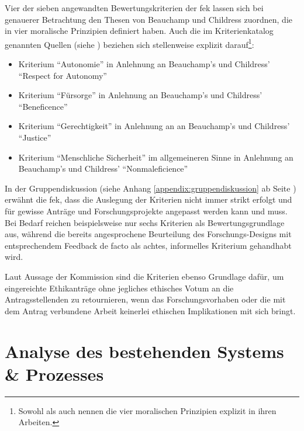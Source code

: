 \documentclass[a4paper,12pt,twoside]{scrreprt}
\begin{document}
\medskip

Vier der sieben angewandten Bewertungskriterien der \ac{fek} lassen sich bei genauerer Betrachtung den Thesen von Beauchamp und Childress zuordnen, die in \cite{beauchamp_principles_1994} vier moralische Prinzipien definiert haben. Auch die im Kriterienkatalog genannten Quellen (siehe \cite[2]{forschungsethik-kommission_der_fachhochschule_vorarlberg_kriterienkatalog_2021}) beziehen sich stellenweise explizit darauf\footnote{Sowohl \cite{marckmann_was_2000} als auch \cite{schuchter_care_2018} nennen die vier moralischen Prinzipien explizit in ihren Arbeiten.}:
\begin{itemize}
    \item Kriterium \enquote{Autonomie} in Anlehnung an Beauchamp's und Childress' \enquote{Respect for Autonomy} \cite[101-149]{beauchamp_principles_1994}
    \item Kriterium \enquote{Fürsorge} in Anlehnung an Beauchamp's und Childress' \enquote{Beneficence} \cite[202-248]{beauchamp_principles_1994}
    \item Kriterium \enquote{Gerechtigkeit} in Anlehnung an an Beauchamp's und Childress' \enquote{Justice} \cite[249-301]{beauchamp_principles_1994}
    \item Kriterium \enquote{Menschliche Sicherheit} im allgemeineren Sinne in Anlehnung an Beauchamp's und Childress' \enquote{Nonmaleficience} \cite[150-201]{beauchamp_principles_1994}
\end{itemize}

In der Gruppendiskussion (siehe Anhang \ref{appendix:gruppendiskussion} ab Seite \pageref{appendix:gruppendiskussion}) erwähnt die \acl{fek}, dass die Auslegung der Kriterien nicht immer strikt erfolgt und für gewisse Anträge und Forschungsprojekte angepasst werden kann und muss. Bei Bedarf reichen beispielsweise nur sechs Kriterien als Bewertungsgrundlage aus, während die bereits angesprochene Beurteilung des Forschungs-Designs mit entsprechendem Feedback de facto als achtes, informelles Kriterium gehandhabt wird.

Laut Aussage der Kommission sind die Kriterien ebenso Grundlage dafür, um eingereichte Ethikanträge ohne jegliches ethisches Votum an die Antragsstellenden zu retournieren, wenn das Forschungsvorhaben oder die mit dem Antrag verbundene Arbeit keinerlei ethischen Implikationen mit sich bringt.

\chapter{Analyse des bestehenden Systems \& Prozesses}
\label{chap:analyse-bestehendes-system-prozess}
\end{document}
